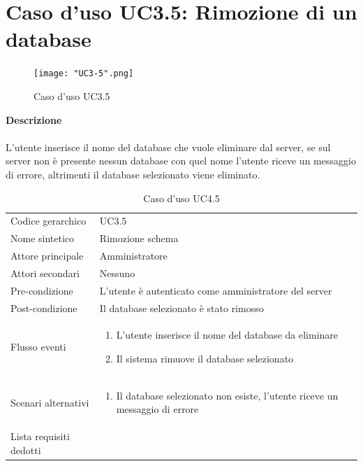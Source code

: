 \documentclass[a4paper]{report}
\begin{document}
	\section{Caso d'uso UC3.5: Rimozione di un database}
	 	\begin{figure}[H]
			\centering
			\texttt{[image: "UC3-5".png]}
			\caption{Caso d'uso UC3.5}
		\end{figure}
	 \textbf{Descrizione} \\ \\
	 L'utente inserisce il nome del database che vuole eliminare dal server, se sul server non è 
	 presente nessun database con quel nome l'utente riceve un messaggio di errore, altrimenti il database
	 selezionato viene eliminato.
		\begin{table}[H]
		\begin{tabularx}{\textwidth}{X | X}\toprule
			\rowcolor{orange!65}Codice gerarchico & UC3.5 \\
			Nome sintetico & Rimozione schema \\
			\rowcolor{orange!65}Attore principale & Amministratore\\
			Attori secondari & Nessuno \\
			\rowcolor{orange!65}Pre-condizione & L'utente è autenticato come amministratore del server\\
			Post-condizione & Il database selezionato è stato rimosso \\
			\rowcolor{orange!65}Flusso eventi & \begin{enumerate}
			\item L'utente inserisce il nome del database da eliminare
			\item Il sistema rimuove il database selezionato
			\end{enumerate} \\
			Scenari alternativi & \begin{enumerate}
			\item Il database selezionato non esiste, l'utente riceve un messaggio di errore
			\end{enumerate} \\
			\rowcolor{orange!65}Lista requisiti dedotti & \\
			\bottomrule
		\end{tabularx}
		\caption{Caso d'uso UC4.5}
	 \end{table}
\end{document}
